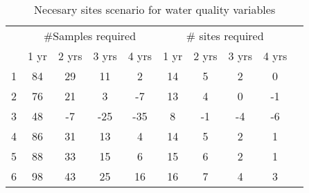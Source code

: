 \begin{table}[htbp]
\caption{Necesary sites scenario for water quality variables}
\begin{tabular}{ccccc|ccccc}
\cline{2-9}
\multicolumn{1}{c}{} &   \multicolumn{4}{c}{ \#Samples required} & \multicolumn{4}{c}{\# sites required} \\ \cline{2-9}\noalign{\smallskip}
\multicolumn{1}{p{3cm}}{Elevation Bands}  & 1 yr  & 2 yrs   & 3 yrs    & 4 yrs   & 1 yr   & 2 yrs  & 3 yrs  & 4 yrs\\ \hline\noalign{\smallskip}
1 &  84 & 29 & 11   & 2    & 14 & 5  & 2   & 0 \\ 
2  & 76 & 21 & 3     & -7   & 13 & 4  & 0   & -1 \\ 
3 &  48 & -7  & -25 & -35 & 8   & -1 & -4 & -6 \\
4 &  86 & 31 & 13  & 4     & 14 & 5  & 2  & 1 \\ 
5 &  88 & 33 & 15  & 6     & 15 & 6  & 2  & 1 \\ 
6 &  98 & 43 & 25  & 16   & 16 & 7  & 4  & 3 \\ \hline
\end{tabular}
\label{tab:WQapsenario}
\end{table}